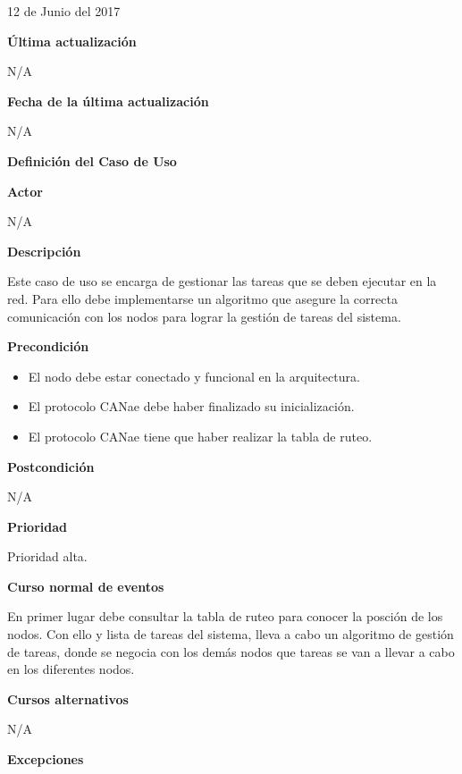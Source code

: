 12 de Junio del 2017

\large\textbf{Última actualización}
\vspace{3mm}

N/A

\large\textbf{Fecha de la última actualización}
\vspace{3mm}

N/A

\Large\textbf{Definición del Caso de Uso}
\vspace{3mm}

\large\textbf{Actor}
\vspace{3mm}

N/A

\large\textbf{Descripción}
\vspace{3mm}

Este caso de uso se encarga de gestionar las tareas que se deben
ejecutar en la red. Para ello debe implementarse un algoritmo que
asegure la correcta comunicación con los nodos para lograr
la gestión de tareas del sistema.

\large\textbf{Precondición}
\begin{itemize}
\item El nodo debe estar conectado y funcional en la arquitectura.
\item El protocolo CANae debe haber finalizado su inicialización.
\item El protocolo CANae tiene que haber realizar la tabla de ruteo.
\end{itemize}

\large\textbf{Postcondición}
\vspace{5mm}

N/A

\large\textbf{Prioridad}
\vspace{3mm}

Prioridad alta.

\large\textbf{Curso normal de eventos}
\vspace{3mm}

En primer lugar debe consultar la tabla de ruteo para conocer la posción de los nodos.
Con ello y lista de tareas del sistema, lleva a cabo un algoritmo de
gestión de tareas, donde se negocia con los demás nodos que tareas se
van a llevar a cabo en los diferentes nodos.

\large\textbf{Cursos alternativos}
\vspace{3mm}

N/A

\large\textbf{Excepciones}
\vspace{3mm}

